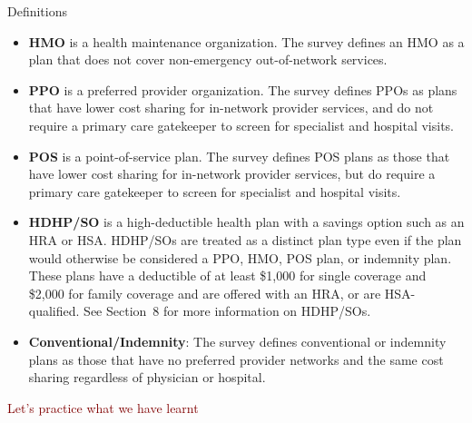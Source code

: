 \begin{frame}{Definitions}

    {\scriptsize
    \begin{itemize}
        \item \textbf{HMO} is a health maintenance organization. The survey defines an HMO
        as a plan that does not cover non-emergency out-of-network services.
    
        \item \textbf{PPO} is a preferred provider organization. The survey defines PPOs as
        plans that have lower cost sharing for in-network provider services, and do not
        require a primary care gatekeeper to screen for specialist and hospital visits.
    
        \item \textbf{POS} is a point-of-service plan. The survey defines POS plans as those
        that have lower cost sharing for in-network provider services, but do require a
        primary care gatekeeper to screen for specialist and hospital visits.
    
        \item \textbf{HDHP/SO} is a high-deductible health plan with a savings option such as
        an HRA or HSA. HDHP/SOs are treated as a distinct plan type even if the plan would
        otherwise be considered a PPO, HMO, POS plan, or indemnity plan. These plans have a
        deductible of at least \$1{,}000 for single coverage and \$2{,}000 for family
        coverage and are offered with an HRA, or are HSA-qualified. See Section~8 for more
        information on HDHP/SOs.
    
        \item \textbf{Conventional/Indemnity}: The survey defines conventional or indemnity
        plans as those that have no preferred provider networks and the same cost sharing
        regardless of physician or hospital.
    \end{itemize}
    } 
   
\end{frame}
\begin{frame}{}

    \begin{center}
        \Large \textcolor{maroon}{Let's practice what we have learnt}
        \end{center}
\end{frame}
